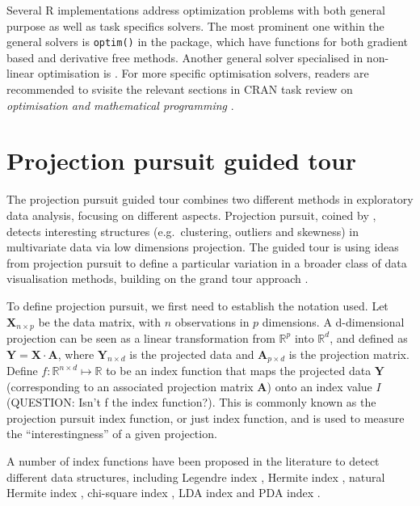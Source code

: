 Several R implementations address optimization problems with both
general purpose as well as task specifics solvers. The most prominent
one within the general solvers is \texttt{optim()} in the
 \citep{stats} package, which have functions for both
gradient based and derivative free methods. Another general solver
specialised in non-linear optimisation is 
\citep{nloptr}. For more specific optimisation solvers, readers are
recommended to svisite the relevant sections in CRAN task review on
\emph{optimisation and mathematical programming}
\citep{crantaskreviewoptim}.

\hypertarget{tour}{%
\section{Projection pursuit guided tour}\label{tour}}

The projection pursuit guided tour combines two different methods in
exploratory data analysis, focusing on different aspects. Projection
pursuit, coined by \citet{friedman1974projection}, detects interesting
structures (e.g.~clustering, outliers and skewness) in multivariate data
via low dimensions projection. The guided tour is using ideas from
projection pursuit to define a particular variation in a broader class
of data visualisation methods, building on the grand tour approach
\citep{As85}.

To define projection pursuit, we first need to establish the notation
used. Let \(\mathbf{X}_{n \times p}\) be the data matrix, with \(n\)
observations in \(p\) dimensions. A d-dimensional projection can be seen
as a linear transformation from \(\mathbb{R}^p\) into \(\mathbb{R}^d\),
and defined as \(\mathbf{Y} = \mathbf{X} \cdot \mathbf{A}\), where
\(\mathbf{Y}_{n \times d}\) is the projected data and
\(\mathbf{A}_{p\times d}\) is the projection matrix. Define
\(f: \mathbb{R}^{n \times d} \mapsto \mathbb{R}\) to be an index
function that maps the projected data \(\mathbf{Y}\) (corresponding to
an associated projection matrix \(\mathbf{A}\)) onto an index value
\(I\) (QUESTION: Isn't f the index function?). This is commonly known as
the projection pursuit index function, or just index function, and is
used to measure the ``interestingness'' of a given projection.

A number of index functions have been proposed in the literature to
detect different data structures, including Legendre index
\citep{friedman1974projection}, Hermite index
\citep{hall1989polynomial}, natural Hermite index
\citep{cook1993projection}, chi-square index
\citep{posse1995projection}, LDA index \citep{lee2005projection} and PDA
index \citep{lee2010projection}.

